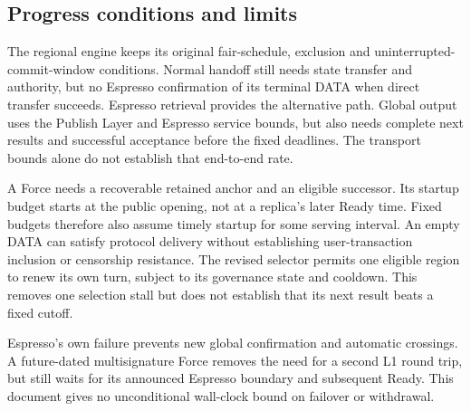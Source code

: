 \documentclass[11pt,a4paper]{article}
\newcounter{protocol}
\begin{document}
\subsection{Progress conditions and limits}
The regional engine keeps its original fair-schedule, exclusion and
uninterrupted-commit-window conditions. Normal handoff still needs
state transfer and authority, but no Espresso confirmation of its
terminal DATA when direct transfer succeeds. Espresso retrieval provides
the alternative path. Global output uses the Publish Layer and Espresso
service bounds, but also needs complete next results and successful
acceptance before the fixed deadlines. The transport bounds alone do not
establish that end-to-end rate.

A Force needs a recoverable retained anchor and an eligible successor.
Its startup budget starts at the public opening, not at a replica's
later Ready time. Fixed budgets therefore also assume timely startup
for some serving interval. An empty DATA can satisfy protocol delivery
without establishing user-transaction inclusion or censorship resistance.
The revised selector permits one eligible region to renew its own turn,
subject to its governance state and cooldown. This removes one selection
stall but does not establish that its next result beats a fixed cutoff.

Espresso's own failure prevents new global confirmation and automatic
crossings. A future-dated multisignature Force removes the need for a
second L1 round trip, but still waits for its announced Espresso
boundary and subsequent Ready. This document gives no unconditional
wall-clock bound on failover or withdrawal.
\end{document}
